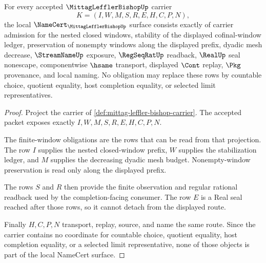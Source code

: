 \begin{theorem}
\label{thm:mittag-leffler-bishop-namecert-obligations}
For every accepted $\MittagLefflerBishopUp$ carrier
$$
K=(I,W,M,S,R,E,H,C,P,N),
$$
the local $\NameCert_{\MittagLefflerBishopUp}$ surface consists exactly of carrier admission for the nested closed windows, stability of the displayed cofinal-window ledger, preservation of nonempty windows along the displayed prefix, dyadic mesh decrease, $\StreamNameUp$ exposure, $\RegSeqRatUp$ readback, $\RealUp$ seal nonescape, componentwise $\hsame$ transport, displayed $\Cont$ replay, $\Pkg$ provenance, and local naming. No obligation may replace these rows by countable choice, quotient equality, host completion equality, or selected limit representatives.
\end{theorem}
\begin{proof}
Project the carrier of \autoref{def:mittag-leffler-bishop-carrier}. The accepted packet exposes exactly $I,W,M,S,R,E,H,C,P,N$.

The finite-window obligations are the rows that can be read from that projection. The row $I$ supplies the nested closed-window prefix, $W$ supplies the stabilization ledger, and $M$ supplies the decreasing dyadic mesh budget. Nonempty-window preservation is read only along the displayed prefix.

The rows $S$ and $R$ then provide the finite observation and regular rational readback used by the completion-facing consumer. The row $E$ is a Real seal reached after those rows, so it cannot detach from the displayed route.

Finally $H,C,P,N$ transport, replay, source, and name the same route. Since the carrier contains no coordinate for countable choice, quotient equality, host completion equality, or a selected limit representative, none of those objects is part of the local NameCert surface.
\end{proof}

